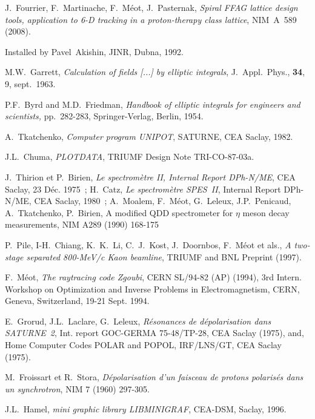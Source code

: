 \begin{thebibliography}{99}
 J.~Fourrier, F.~Martinache, F.~M\'eot, J.~Pasternak, 
\textsl{Spiral FFAG lattice design tools,  application to 6-D tracking in a proton-therapy class lattice}, 
NIM~A~589 (2008). 

 Installed by Pavel~Akishin, JINR, Dubna, 1992.

 M.W.~Garrett, \textsl{Calculation of
fields  [...] by elliptic integrals}, J.~Appl.~Phys., \textbf{34}, 9, sept.~1963.  

 P.F.~Byrd and M.D.~Friedman, \textsl{Handbook of elliptic integrals 
for engineers and scientists,} pp.~282-283, Springer-Verlag, Berlin, 1954.  

 A.~Tkatchenko, \textsl{Computer program UNIPOT}, SATURNE, CEA Saclay, 1982. 

 J.L.~Chuma, \textsl{PLOTDATA}, TRIUMF Design Note TRI-CO-87-03a.

 J.~Thirion et P.~Birien, 
\textsl{Le spectrom\`etre II, Internal Report DPh-N/ME}, 
CEA Saclay, 23 D\'ec. 1975~; 
H.~Catz, \textsl{Le spectrom\`etre SPES~II}, Internal Report DPh-N/ME, CEA Saclay, 1980~; 
 A.~Moalem, F.~M\'eot, G.~Leleux, J.P.~Penicaud, A.~Tkatchenko, P.~Birien,  
A modified QDD spectrometer for $\eta$ meson decay measurements,  
NIM A289 (1990) 168-175 

  P.~Pile, I-H.~Chiang, K.~K.~Li, C.~J.~Kost, J.~Doornbos, F.~M\'eot et als., 
\textsl{A two-stage separated 800-MeV/c Kaon beamline}, 
 TRIUMF and BNL Preprint (1997).

 F.~M\'eot, 
\textsl{The raytracing code Zgoubi}, CERN SL/94-82 (AP) (1994), 
3rd Intern. Workshop on Optimization and Inverse Problems 
in Electromagnetism, CERN, Geneva, Switzerland, 19-21 Sept. 1994. 

 E.~Grorud, J.L.~Laclare, G.~Leleux, 
\textsl{R\'esonances de d\'epolarisation dans SATURNE~2}, 
Int. report GOC-GERMA 75-48/TP-28, CEA Saclay (1975), 
and, Home Computer Codes POLAR and POPOL, IRF/LNS/GT, CEA Saclay (1975).

 M.~Froissart et R.~Stora, 
\textsl{D\'epolarisation d'un faisceau de protons polaris\'es dans un synchrotron},
 NIM 7 (1960) 297-305.

 J.L.~Hamel, \textsl{mini graphic library LIBMINIGRAF}, CEA-DSM, Saclay, 1996.


\end{thebibliography}



